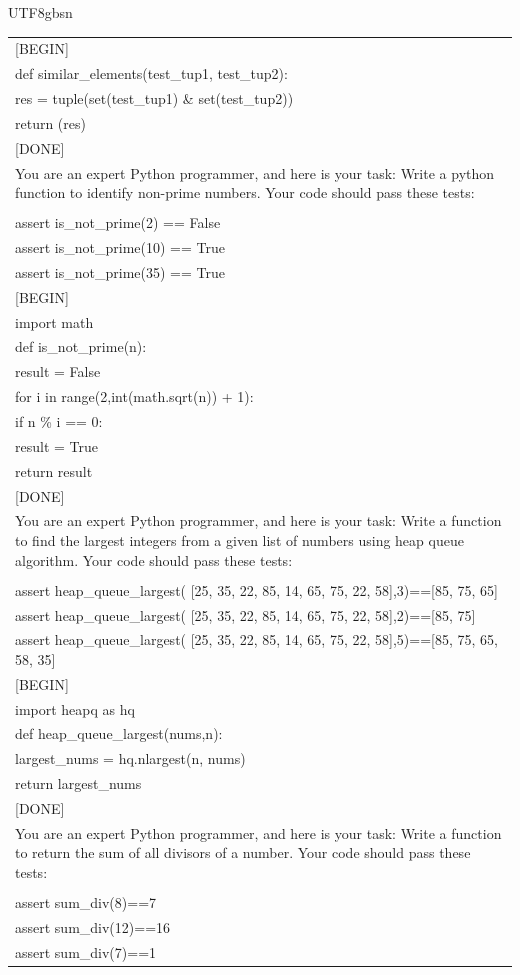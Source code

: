 \documentclass[11pt, a4paper, logo, copyright, nonumbering]{deepseek}
\begin{document}
\begin{CJK*}{UTF8}{gbsn}
\begin{table}[h]
\begin{tabular}{p{12cm}}
[BEGIN]\\
def similar\_elements(test\_tup1, test\_tup2):\\
  res = tuple(set(test\_tup1) \& set(test\_tup2))\\
  return (res) \\

[DONE]\\
You are an expert Python programmer, and here is your task: Write a python function to identify non-prime numbers. Your code should pass these tests:\\
\\
assert is\_not\_prime(2) == False\\
assert is\_not\_prime(10) == True\\
assert is\_not\_prime(35) == True\\

[BEGIN]\\
import math\\
def is\_not\_prime(n):\\
    result = False\\
    for i in range(2,int(math.sqrt(n)) + 1):\\
        if n \% i == 0:\\
            result = True\\
    return result\\

[DONE]\\
You are an expert Python programmer, and here is your task: Write a function to find the largest integers from a given list of numbers using heap queue algorithm. Your code should pass these tests:\\
\\
assert heap\_queue\_largest( [25, 35, 22, 85, 14, 65, 75, 22, 58],3)==[85, 75, 65] \\
assert heap\_queue\_largest( [25, 35, 22, 85, 14, 65, 75, 22, 58],2)==[85, 75] \\
assert heap\_queue\_largest( [25, 35, 22, 85, 14, 65, 75, 22, 58],5)==[85, 75, 65, 58, 35]\\

[BEGIN]\\
import heapq as hq\\
def heap\_queue\_largest(nums,n):\\
  largest\_nums = hq.nlargest(n, nums)\\
  return largest\_nums\\

[DONE]\\
You are an expert Python programmer, and here is your task: Write a function to return the sum of all divisors of a number. Your code should pass these tests:\\
\\
assert sum\_div(8)==7\\
assert sum\_div(12)==16\\
assert sum\_div(7)==1\\


\end{tabular}
\end{table}
\end{CJK*}
\end{document}
